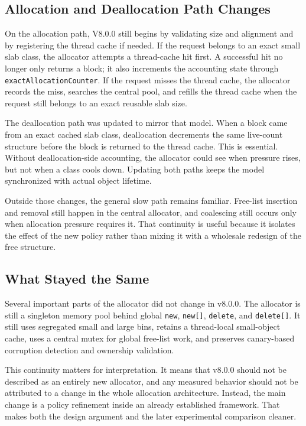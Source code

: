 \subsection{Allocation and Deallocation Path Changes}

On the allocation path, V8.0.0 still begins by validating size and alignment and by registering the thread
cache if needed. If the request belongs to an exact small slab class, the allocator attempts a thread-cache
hit first. A successful hit no longer only returns a block; it also increments the accounting state through
\texttt{exactAllocationCounter}. If the request misses the thread cache, the allocator records the miss,
searches the central pool, and refills the thread cache when the request still belongs to an exact reusable
slab size.

The deallocation path was updated to mirror that model. When a block came from an exact cached slab class,
deallocation decrements the same live-count structure before the block is returned to the thread cache. This
is essential. Without deallocation-side accounting, the allocator could see when pressure rises, but not when
a class cools down. Updating both paths keeps the model synchronized with actual object lifetime.

Outside those changes, the general slow path remains familiar. Free-list insertion and removal still happen
in the central allocator, and coalescing still occurs only when allocation pressure requires it. That
continuity is useful because it isolates the effect of the new policy rather than mixing it with a wholesale
redesign of the free structure.

\subsection{What Stayed the Same}

Several important parts of the allocator did not change in v8.0.0. The allocator is still a singleton memory
pool behind global \texttt{new}, \texttt{new[]}, \texttt{delete}, and \texttt{delete[]}. It still uses
segregated small and large bins, retains a thread-local small-object cache, uses a central mutex for
global free-list work, and preserves canary-based corruption detection and ownership validation.

This continuity matters for interpretation. It means that v8.0.0 should not be described as an entirely new
allocator, and any measured behavior should not be attributed to a change in the whole allocation architecture.
Instead, the main change is a policy refinement inside an already established framework. That makes both the
design argument and the later experimental comparison cleaner.

